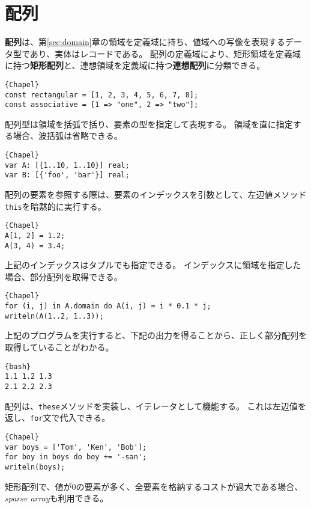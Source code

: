 \documentclass[10pt,a4paper]{book}
\begin{document}
\chapter{配列\label{sec:array}}

\textbf{配列}は、第\ref{sec:domain}章の領域を定義域に持ち、値域への写像を表現するデータ型であり、実体はレコードである。
配列の定義域により、矩形領域を定義域に持つ\textbf{矩形配列}と、連想領域を定義域に持つ\textbf{連想配列}に分類できる。

\begin{Verbatim}{Chapel}
const rectangular = [1, 2, 3, 4, 5, 6, 7, 8];
const associative = [1 => "one", 2 => "two"];
\end{Verbatim}

配列型は領域を括弧で括り、要素の型を指定して表現する。
領域を直に指定する場合、波括弧は省略できる。

\begin{Verbatim}{Chapel}
var A: [{1..10, 1..10}] real;
var B: [{'foo', 'bar'}] real;
\end{Verbatim}

配列の要素を参照する際は、要素のインデックスを引数として、左辺値メソッド\verb#this#を暗黙的に実行する。

\begin{Verbatim}{Chapel}
A[1, 2] = 1.2;
A(3, 4) = 3.4;
\end{Verbatim}

上記のインデックスはタプルでも指定できる。
インデックスに領域を指定した場合、部分配列を取得できる。

\begin{Verbatim}{Chapel}
for (i, j) in A.domain do A(i, j) = i * 0.1 * j;
writeln(A(1..2, 1..3));
\end{Verbatim}

上記のプログラムを実行すると、下記の出力を得ることから、正しく部分配列を取得していることがわかる。

\begin{Verbatim}{bash}
1.1 1.2 1.3
2.1 2.2 2.3
\end{Verbatim}

配列は、\verb#these#メソッドを実装し、イテレータとして機能する。
これは左辺値を返し、\verb#for#文で代入できる。

\begin{Verbatim}{Chapel}
var boys = ['Tom', 'Ken', 'Bob'];
for boy in boys do boy += '-san';
writeln(boys);
\end{Verbatim}

矩形配列で、値が0の要素が多く、全要素を格納するコストが過大である場合、\textit{sparse array}も利用できる。
\end{document}

